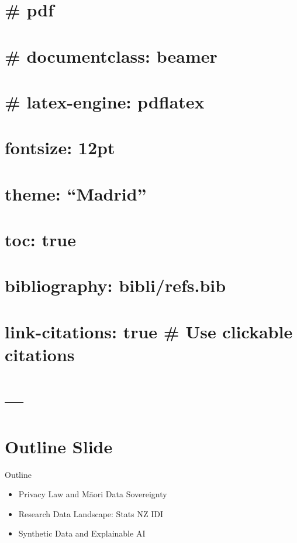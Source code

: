 \documentclass[
  12pt,
  ignorenonframetext,
]{beamer}
\providecommand{\tightlist}{%
  \setlength{\itemsep}{0pt}\setlength{\parskip}{0pt}}\usepackage{longtable,booktabs,array}
\begin{document}
\section{\# pdf}\label{pdf}

\section{\# documentclass: beamer}\label{documentclass-beamer}

\section{\# latex-engine: pdflatex}\label{latex-engine-pdflatex}

\section{fontsize: 12pt}\label{fontsize-12pt}

\section{theme: ``Madrid''}\label{theme-madrid}

\section{toc: true}\label{toc-true-1}

\section{bibliography: bibli/refs.bib}\label{bibliography-biblirefs.bib}

\section{link-citations: true \# Use clickable
citations}\label{link-citations-true-use-clickable-citations}

\section{---}\label{section-1}

\section{Outline Slide}\label{outline-slide}

\begin{frame}{Outline}
\label{outline}
\begin{itemize}
\tightlist
\item
  Privacy Law and Māori Data Sovereignty
\item
  Research Data Landscape: Stats NZ IDI
\item
  Synthetic Data and Explainable AI
\end{itemize}
\end{frame}
\end{document}

